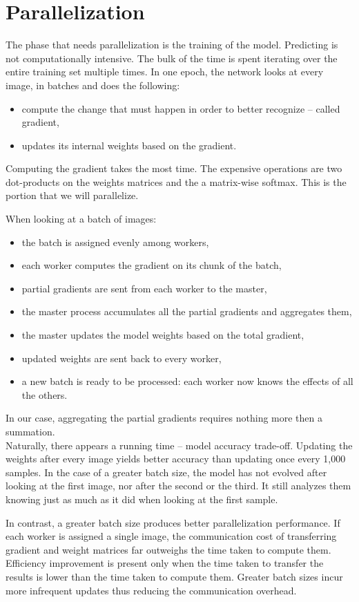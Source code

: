 \documentclass[a4paper]{article}
\begin{document}
\newpage
\section{Parallelization}
The phase that needs parallelization is the training of the model. Predicting is not computationally intensive. The bulk of the time is spent iterating over the entire training set multiple times. In one epoch, the network looks at every image, in batches and does the following:
\begin{itemize}
\item compute the change that must happen in order to better recognize -- called gradient,
\item updates its internal weights based on the gradient.
\end{itemize}
Computing the gradient takes the most time. The expensive operations are two dot-products on the weights matrices and the a matrix-wise softmax. This is the portion that we will parallelize.

When looking at a batch of images:
\begin{itemize}
\item the batch is assigned evenly among workers,
\item each worker computes the gradient on its chunk of the batch,
\item partial gradients are sent from each worker to the master,
\item the master process accumulates all the partial gradients and aggregates them,
\item the master updates the model weights based on the total gradient,
\item updated weights are sent back to every worker,
\item a new batch is ready to be processed: each worker now knows the effects of all the others.
\end{itemize}
In our case, aggregating the partial gradients requires nothing more then a summation.
\\

Naturally, there appears a running time -- model accuracy trade-off. Updating the weights after every image yields better accuracy than updating once every 1,000 samples. In the case of a greater batch size, the model has not evolved after looking at the first image, nor after the second or the third. It still analyzes them knowing just as much as it did when looking at the first sample.

In contrast, a greater batch size produces better parallelization performance. If each worker is assigned a single image, the communication cost of transferring gradient and weight matrices far outweighs the time taken to compute them. Efficiency improvement is present only when the time taken to transfer the results is lower than the time taken to compute them. Greater batch sizes incur more infrequent updates thus reducing the communication overhead.
\end{document}
